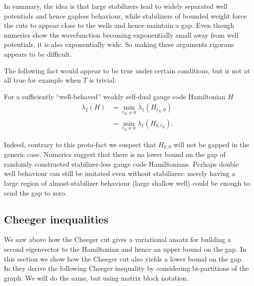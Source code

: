 \documentclass[a4paper,onecolumn,11pt,unpublished]{quantumarticle}
\def\Ham{H}
\renewenvironment{framed}
{\begin{samepage}
\MakeFramed{\hsize0.8\linewidth\advance\hsize-\width\FrameRestore}}
{\endMakeFramed\end{samepage}}
\begin{document}
In summary, the idea is that large stabilizers lead to
widely separated well potentials and hence gapless behaviour,
while stabilizers of bounded weight force the cuts to
appear close to the wells and hence maintain a gap.
Even though numerics show the wavefunction becoming 
exponentially small away from well potentials,
it is also exponentially wide.
So making these arguments rigorous appears to be difficult.

The following fact would appear to be true under certain conditions,
but is not at all true for example when $T$ is trivial:
\begin{framed}
For a sufficiently ``well-behaved''
weakly self-dual
gauge code Hamiltonian $H$
\begin{align*}
\lambda_2(\Ham) 
    &= \min_{t_X\ne 0} \lambda_1(\Ham_{t_X,0})\\
    &= \min_{t_Z\ne 0} \lambda_1(\Ham_{0,t_Z}).
\end{align*}
\end{framed}
Indeed, contrary to this proto-fact
we suspect that $H_{0,0}$ will not be gapped in
the generic case. 
Numerics suggest that
there is no lower bound on the gap of 
randomly constructed stabilizer-less gauge code Hamiltonians.
Perhaps double well behaviour can still be imitated even without
stabilizers: merely having a large region of almost-stabilizer
behaviour (large shallow well) could be enough to send the gap to zero.


\subsection{Cheeger inequalities}\label{Sec73}

We saw above how the Cheeger cut gives a variational ansatz
for building a second eigenvector to the Hamiltonian and hence
an upper bound on the gap.
In this section we show how the Cheeger cut also 
yields a lower bound on the gap.
In \cite{Friedland2002} they derive the following Cheeger inequality
by considering bi-partitions of the graph. We will do the
same, but using matrix block notation.
\end{document}
